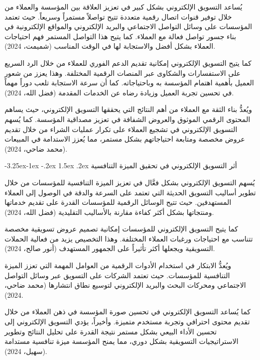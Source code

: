 \documentclass[12pt, a4paper]{report}
\makeatletter
\renewcommand\subsection{\@startsection{subsection}{2}{\z@}%
  {-3.25ex\@plus -1ex \@minus -.2ex}%
  {1.5ex \@plus .2ex}%
  {\normalfont\large\bfseries\color{sectiongray}}}
\makeatother
\begin{document}
يُساعد التسويق الإلكتروني بشكل كبير في تعزيز العلاقة بين المؤسسة والعملاء من خلال توفير قنوات اتصال رقمية متعددة تتيح تواصلاً مستمراً وسريعاً. حيث تعتمد المؤسسات على وسائل التواصل الاجتماعي والبريد الإلكتروني والمواقع الإلكترونية في بناء جسور تواصل فعالة مع العملاء. كما يتيح هذا التواصل المستمر فهم احتياجات العملاء بشكل أفضل والاستجابة لها في الوقت المناسب (شميمت، 2024).

كما يتيح التسويق الإلكتروني إمكانية تقديم الدعم الفوري للعملاء من خلال الرد السريع على الاستفسارات والشكاوى عبر المنصات الرقمية المختلفة. وهذا يعزز من شعور العميل بأهمية اهتمام المؤسسة به وباحتياجاته. كما أن سرعة الاستجابة تلعب دوراً مهماً في تحسين تجربة العميل وزيادة رضاه عن الخدمات المقدمة (فضل الله، 2024).

ويُعدُّ بناء الثقة مع العملاء من أهم النتائج التي يحققها التسويق الإلكتروني، حيث يساهم المحتوى الرقمي الموثوق والعروض الشفافة في تعزيز مصداقية المؤسسة. كما يُسهم التسويق الإلكتروني في تشجيع العملاء على تكرار عمليات الشراء من خلال تقديم عروض مخصصة ومتابعة احتياجاتهم بشكل مستمر، مما يُعزز الاستدامة في المبيعات (محمد ضاحي، 2024).

\subsection{أثر التسويق الإلكتروني في تحقيق الميزة التنافسية}

يُسهم التسويق الإلكتروني بشكل فعَّال في تعزيز الميزة التنافسية للمؤسسات من خلال تطوير أساليب التسويق الحديثة التي تعتمد على السرعة والدقة في الوصول إلى العملاء المستهدفين. حيث تتيح الوسائل الرقمية للمؤسسات القدرة على تقديم خدماتها ومنتجاتها بشكل أكثر كفاءة مقارنة بالأساليب التقليدية (فضل الله، 2024).

كما يتيح التسويق الإلكتروني للمؤسسات إمكانية تصميم عروض تسويقية مخصصة تتناسب مع احتياجات ورغبات العملاء المختلفة. وهذا التخصيص يزيد من فعالية الحملات التسويقية ويجعلها أكثر تأثيراً على الجمهور المستهدف (أنور صالح، 2024).

ويُعدُّ الابتكار في استخدام الأدوات الرقمية من العوامل المهمة التي تعزز الميزة التنافسية للمؤسسات. حيث تعتمد الشركات على التسويق عبر وسائل التواصل الاجتماعي ومحركات البحث والبريد الإلكتروني لتوسيع نطاق انتشارها (محمد ضاحي، 2024).

كما يُساعد التسويق الإلكتروني في تحسين صورة المؤسسة في ذهن العملاء من خلال تقديم محتوى احترافي وتجربة مستخدم متميزة. وأخيراً، يؤدي التسويق الإلكتروني إلى تحسين الأداء البيعي بشكل مستمر نتيجة القدرة على تحليل النتائج وتطوير الاستراتيجيات التسويقية بشكل دوري، مما يمنح المؤسسة ميزة تنافسية مستدامة (سهيل، 2024).
\end{document}
